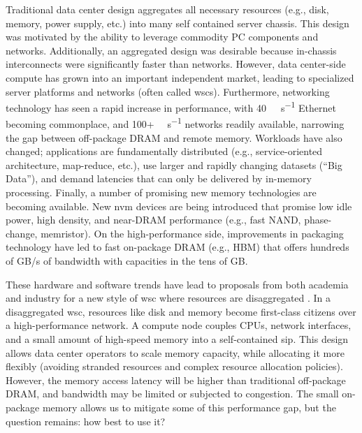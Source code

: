 Traditional data center design aggregates all necessary resources (e.g., disk,
memory, power supply, etc.) into many self contained server chassis. This
design was motivated by the ability to leverage commodity PC components and
networks\cite{NOW}.  Additionally, an aggregated design was desirable because
in-chassis interconnects were significantly faster than networks. However,
data center-side compute has grown into an important independent market, leading
to specialized server platforms and networks (often called \glspl{wsc}).
Furthermore, networking technology has seen a rapid increase in performance,
with \SI{40}{\giga\bit\per\second} Ethernet becoming commonplace, and 100+ \si{\giga\bit\per\second} networks readily
available, narrowing the gap between off-package DRAM and remote
memory.
Workloads have also changed; applications are fundamentally distributed (e.g.,
service-oriented architecture, map-reduce, etc.), use larger and rapidly
changing datasets (``Big Data''), and demand latencies that can only be
delivered by in-memory processing. Finally, a number of promising new memory
technologies are becoming available. New \gls{nvm} devices are being
introduced that promise low idle power, high density, and near-DRAM performance
(e.g., fast NAND, phase-change, memristor). On the high-performance side,
improvements in packaging technology have led to fast on-package DRAM (e.g.,
HBM) that offers hundreds of GB/s of bandwidth with capacities in the tens of
GB.

These hardware and software trends have lead to proposals from both
academia\cite{firebox}\cite{dredbox} and
industry\cite{themachine}\cite{huaweidc30}\cite{intelrsa}\cite{fbdisag} for a
new style of \gls{wsc} where resources are disaggregated .  In a
disaggregated \gls{wsc}, resources like disk and memory become first-class
citizens over a high-performance network. A compute node couples CPUs, network
interfaces, and a small amount of high-speed memory into a self-contained
\gls{sip}. This design allows data center operators to scale memory capacity,
while allocating it more flexibly (avoiding stranded resources and complex
resource allocation policies). However, the memory access latency will be
higher than traditional off-package DRAM, and bandwidth may be limited or
subjected to congestion. The small on-package memory allows us to mitigate some
of this performance gap, but the question remains: how best to use it?

